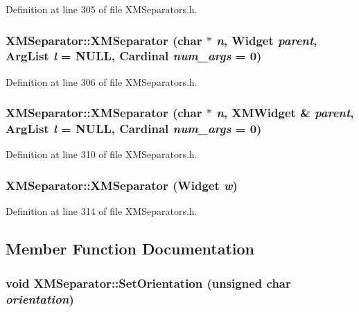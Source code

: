 Definition at line 305 of file XMSeparators.h.
\subsubsection{\setlength{\rightskip}{0pt plus 5cm}XMSeparator::XMSeparator (char $\ast$ {\em n}, Widget {\em parent}, Arg\-List {\em l} = NULL, Cardinal {\em num\_\-args} = 0)\hspace{0.3cm}{\tt  [inline]}}\label{classXMSeparator_a1}




Definition at line 306 of file XMSeparators.h.
\subsubsection{\setlength{\rightskip}{0pt plus 5cm}XMSeparator::XMSeparator (char $\ast$ {\em n}, {\bf XMWidget} \& {\em parent}, Arg\-List {\em l} = NULL, Cardinal {\em num\_\-args} = 0)\hspace{0.3cm}{\tt  [inline]}}\label{classXMSeparator_a2}




Definition at line 310 of file XMSeparators.h.
\subsubsection{\setlength{\rightskip}{0pt plus 5cm}XMSeparator::XMSeparator (Widget {\em w})\hspace{0.3cm}{\tt  [inline]}}\label{classXMSeparator_a3}




Definition at line 314 of file XMSeparators.h.

\subsection{Member Function Documentation}
\subsubsection{\setlength{\rightskip}{0pt plus 5cm}void XMSeparator::Set\-Orientation (unsigned char {\em orientation})\hspace{0.3cm}{\tt  [inline]}}\label{classXMSeparator_a5}




